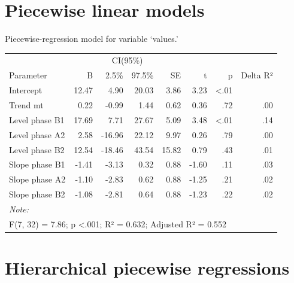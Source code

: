 \documentclass[
]{book}
\newenvironment{Shaded}{\begin{snugshade}}{\end{snugshade}}
\newcommand{\FunctionTok}[1]{\textcolor[rgb]{0.00,0.00,0.00}{#1}}
\newcommand{\NormalTok}[1]{#1}
\newcommand{\OtherTok}[1]{\textcolor[rgb]{0.56,0.35,0.01}{#1}}
\newcommand{\SpecialCharTok}[1]{\textcolor[rgb]{0.00,0.00,0.00}{#1}}
\begin{document}
\hypertarget{piecewise-linear-models}{%
\section{Piecewise linear models}\label{piecewise-linear-models}}

\begin{Shaded}
\end{Shaded}

Piecewise-regression model for variable `values.'

\begin{table}
\centering
\begin{tabular}{lrrrrrrr}
\toprule
\multicolumn{2}{c}{ } & \multicolumn{2}{c}{CI(95\%)} & \multicolumn{4}{c}{ } \\
\cmidrule(l{3pt}r{3pt}){3-4}
Parameter & B & 2.5\% & 97.5\% & SE & t & p & Delta R²\\
\midrule
Intercept & 12.47 & 4.90 & 20.03 & 3.86 & 3.23 & <.01 & \\
Trend mt & 0.22 & -0.99 & 1.44 & 0.62 & 0.36 & .72 & .00\\
Level phase B1 & 17.69 & 7.71 & 27.67 & 5.09 & 3.48 & <.01 & .14\\
Level phase A2 & 2.58 & -16.96 & 22.12 & 9.97 & 0.26 & .79 & .00\\
Level phase B2 & 12.54 & -18.46 & 43.54 & 15.82 & 0.79 & .43 & .01\\
\addlinespace
Slope phase B1 & -1.41 & -3.13 & 0.32 & 0.88 & -1.60 & .11 & .03\\
Slope phase A2 & -1.10 & -2.83 & 0.62 & 0.88 & -1.25 & .21 & .02\\
Slope phase B2 & -1.08 & -2.81 & 0.64 & 0.88 & -1.23 & .22 & .02\\
\bottomrule
\multicolumn{8}{l}{\rule{0pt}{1em}\textit{Note: }}\\
\multicolumn{8}{l}{\rule{0pt}{1em}F(7, 32) = 7.86; p <.001; R² = 0.632; Adjusted R² = 0.552}\\
\end{tabular}
\end{table}

\hypertarget{hierarchical-piecewise-regressions}{%
\section{Hierarchical piecewise regressions}\label{hierarchical-piecewise-regressions}}
\end{document}
